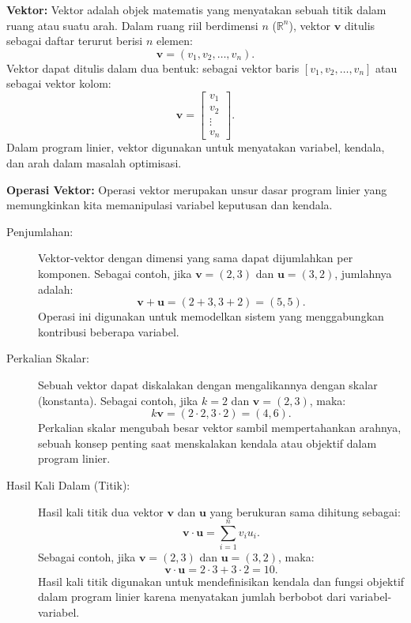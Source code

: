 \textbf{Vektor:}  
Vektor adalah objek matematis yang menyatakan sebuah titik dalam ruang atau suatu arah. Dalam ruang riil berdimensi \(n\) (\(\mathbb{R}^n\)), vektor \(\mathbf{v}\) ditulis sebagai daftar terurut berisi \(n\) elemen:  
\[
\mathbf{v} = (v_1, v_2, \dots, v_n).
\]  
Vektor dapat ditulis dalam dua bentuk: sebagai vektor baris \([v_1, v_2, \dots, v_n]\) atau sebagai vektor kolom:
\[
\mathbf{v} = \begin{bmatrix} v_1 \\ v_2 \\ \vdots \\ v_n \end{bmatrix}.
\]  
Dalam program linier, vektor digunakan untuk menyatakan variabel, kendala, dan arah dalam masalah optimisasi.

\medskip  
\textbf{Operasi Vektor:}  
Operasi vektor merupakan unsur dasar program linier yang memungkinkan kita memanipulasi variabel keputusan dan kendala.

\begin{description}
    \item[Penjumlahan:]  
    Vektor-vektor dengan dimensi yang sama dapat dijumlahkan per komponen. Sebagai contoh, jika \(\mathbf{v} = (2, 3)\) dan \(\mathbf{u} = (3, 2)\), jumlahnya adalah:  
    \[
    \mathbf{v} + \mathbf{u} = (2+3, 3+2) = (5, 5).
    \]  
    Operasi ini digunakan untuk memodelkan sistem yang menggabungkan kontribusi beberapa variabel.

    \item[Perkalian Skalar:]  
    Sebuah vektor dapat diskalakan dengan mengalikannya dengan skalar (konstanta). Sebagai contoh, jika \(k = 2\) dan \(\mathbf{v} = (2, 3)\), maka:
    \[
    k\mathbf{v} = (2 \cdot 2, 3 \cdot 2) = (4, 6).
    \]  
    Perkalian skalar mengubah besar vektor sambil mempertahankan arahnya, sebuah konsep penting saat menskalakan kendala atau objektif dalam program linier.

    \item[Hasil Kali Dalam (Titik):]  
    Hasil kali titik dua vektor \(\mathbf{v}\) dan \(\mathbf{u}\) yang berukuran sama dihitung sebagai:
    \[
    \mathbf{v} \cdot \mathbf{u} = \sum_{i=1}^n v_i u_i.
    \]  
    Sebagai contoh, jika \(\mathbf{v} = (2, 3)\) dan \(\mathbf{u} = (3, 2)\), maka:
    \[
    \mathbf{v} \cdot \mathbf{u} = 2 \cdot 3 + 3 \cdot 2 = 10.
    \]  
    Hasil kali titik digunakan untuk mendefinisikan kendala dan fungsi objektif dalam program linier karena menyatakan jumlah berbobot dari variabel-variabel.
\end{description}

